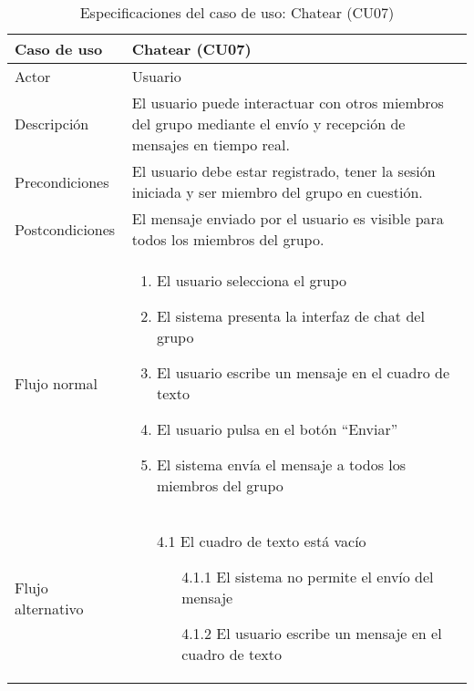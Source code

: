 \begin{table}[h]
    \centering
    \begin{tabular}{|m{3cm}|m{11cm}|}
        \hline
        \rowcolor{blue!20} Caso de uso & Chatear (CU07) \\
        \hline
        Actor & Usuario \\
        \hline
        \rowcolor{blue!20} Descripción & El usuario puede interactuar con otros miembros del grupo mediante el envío y recepción de mensajes en tiempo real. \\
        \hline
        Precondiciones & El usuario debe estar registrado, tener la sesión iniciada y ser miembro del grupo en cuestión. \\
        \hline
        \rowcolor{blue!20} Postcondiciones & El mensaje enviado por el usuario es visible para todos los miembros del grupo. \\
        \hline
        Flujo normal & 
            \begin{enumerate}[noitemsep]
            \item El usuario selecciona el grupo
            \item El sistema presenta la interfaz de chat del grupo
            \item El usuario escribe un mensaje en el cuadro de texto
            \item El usuario pulsa en el botón \enquote{Enviar}
            \item El sistema envía el mensaje a todos los miembros del grupo
            \end{enumerate}
         \\
        \hline
        Flujo alternativo & 
        \begin{enumerate}[noitemsep]
            \item[4.1] El cuadro de texto está vacío
            \begin{enumerate}[noitemsep]
                \item[4.1.1] El sistema no permite el envío del mensaje
                \item[4.1.2] El usuario escribe un mensaje en el cuadro de texto
            \end{enumerate}
        \end{enumerate} \\
        \hline
    \end{tabular}
    \caption{Especificaciones del caso de uso: Chatear (CU07)}
\end{table}

